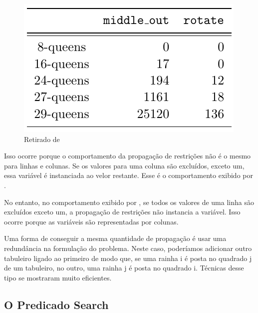 \begin{figure}[H]
  \caption{Retirado de \cite{krzysztof}}\label{fig:psi}
  \centering
  \includegraphics[scale=0.4]{rotate.png}
\end{figure}

Isso ocorre porque o comportamento da propagação de restrições não é o mesmo para linhas e colunas.
Se os valores para uma coluna são excluídos, exceto um, essa variável é instanciada ao velor
restante. Esse é o comportamento exibido por .

No entanto, no comportamento exibido por , se todos os valores de uma linha
são excluídos exceto um, a propagação de restrições não instancia a variável. Isso ocorre porque as
variáveis são representadas por colunas.

Uma forma de conseguir a mesma quantidade de propagação é usar uma redundância na formulação do
problema. Neste caso, poderíamos adicionar outro tabuleiro ligado ao primeiro de modo que, se uma
rainha i é posta no quadrado j de um tabuleiro, no outro, uma rainha j é posta no quadrado i.
Técnicas desse tipo se mostraram muito eficientes.

\subsection{O Predicado Search}


